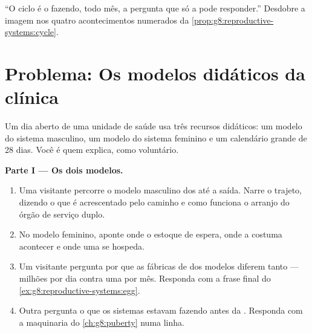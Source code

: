 \begin{exercise}[$\star\star\star$]\label{exo:g8:reproductive-systems:12}
``O ciclo é o  fazendo, todo mês, a pergunta que só a 
pode responder.'' Desdobre a imagem nos quatro acontecimentos
numerados da \cref{prop:g8:reproductive-systems:cycle}.
\end{exercise}

\section{Problema: Os modelos didáticos da clínica}

\begin{problem}\label{pb:g8:reproductive-systems:1}
Um dia aberto de uma unidade de saúde usa três recursos didáticos: um
modelo do sistema masculino, um modelo do sistema feminino e um
calendário grande de 28 dias. Você é quem explica, como voluntário.

\medskip\noindent\textbf{Parte I --- Os dois modelos.}
\begin{enumerate}
  \item Uma visitante percorre o modelo masculino dos  até
        a saída. Narre o trajeto, dizendo o que é acrescentado pelo
        caminho e como funciona o arranjo do órgão de serviço duplo.
  \item No modelo feminino, aponte onde o estoque de  espera,
        onde a  costuma acontecer e onde uma  se
        hospeda.
  \item Um visitante pergunta por que as fábricas de  dos
        modelos diferem tanto --- milhões por dia contra uma por mês.
        Responda com a frase final do
        \cref{ex:g8:reproductive-systems:egg}.
  \item Outra pergunta o que os sistemas estavam fazendo antes da
        . Responda com a maquinaria do \cref{ch:g8:puberty}
        numa linha.
\end{enumerate}


\end{problem}
